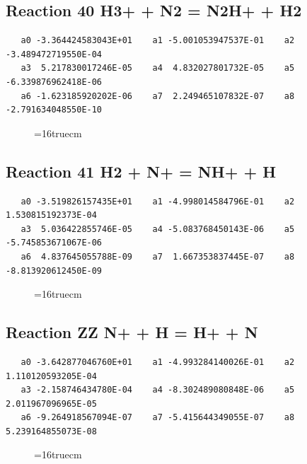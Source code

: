 \documentclass[12pt,dvipdfm]{article}
\begin{document}
\subsection{
Reaction 40 H3+ + N2 = N2H+ + H2}
\begin{small}\begin{verbatim}
   a0 -3.364424583043E+01    a1 -5.001053947537E-01    a2 -3.489472719550E-04
   a3  5.217830017246E-05    a4  4.832027801732E-05    a5 -6.339876962418E-06
   a6 -1.623185920202E-06    a7  2.249465107832E-07    a8 -2.791634048550E-10
   \end{verbatim}\end{small}
\begin{figure}[h!] \label{n2rates}
\epsfxsize=16truecm
\end{figure}
\newpage

\subsection{
Reaction 41 H2 + N+ = NH+ + H}
\begin{small}\begin{verbatim}
   a0 -3.519826157435E+01    a1 -4.998014584796E-01    a2  1.530815192373E-04
   a3  5.036422855746E-05    a4 -5.083768450143E-06    a5 -5.745853671067E-06
   a6  4.837645055788E-09    a7  1.667353837445E-07    a8 -8.813920612450E-09
   \end{verbatim}\end{small}
\begin{figure}[h!] \label{n2rates}
\epsfxsize=16truecm
\end{figure}
\newpage

\subsection{
Reaction ZZ N+ + H = H+ + N}
\begin{small}\begin{verbatim}
   a0 -3.642877046760E+01    a1 -4.993284140026E-01    a2  1.110120593205E-04
   a3 -2.158746434780E-04    a4 -8.302489080848E-06    a5  2.011967096965E-05
   a6 -9.264918567094E-07    a7 -5.415644349055E-07    a8  5.239164855073E-08
   \end{verbatim}\end{small}
\begin{figure}[h!] \label{n2rates}
\epsfxsize=16truecm
\end{figure}
\newpage
\end{document}
